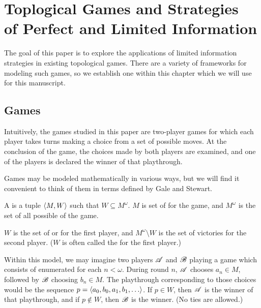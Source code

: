 
\chapter{Toplogical Games and Strategies\\ of Perfect and Limited Information}

The goal of this paper is to explore the applications of limited information
strategies in existing topological games. There are a variety of frameworks
for modeling such games, so we establish one within this chapter which we 
will use for this manuscript.

\section{Games}

Intuitively, the games studied in this paper are two-player games for which
each player takes turns making a choice from a set of possible moves. At
the conclusion of the game, the choices made by both players are examined,
and one of the players is declared the winner of that playthrough.

Games may be modeled mathematically in various ways,
but we will find it convenient to think of them in terms defined by
Gale and Stewart. \cite{gale}

\begin{defn}
  A  is a tuple $\langle M,W\rangle$ such that 
  $W\subseteq M^{\omega}$. $M$ is set of  for
  the game, and $M^{\omega}$ is the set of all possible 
   of the game.

  $W$ is the set of  or  for the 
  first player, and $M^{\omega}\setminus W$ is the set of victories for the 
  second player. ($W$ is often called the  for the
  first player.)
\end{defn}

Within this model, we may imagine two players $\mathscr{A}$ and $\mathscr{B}$ playing a 
game which consists of  enumerated for each $n<\omega$.
During round $n$, $\mathscr{A}$ chooses $a_n\in M$, followed by $\mathscr{B}$ choosing
$b_n\in M$. The playthrough corresponding to those choices would be
the sequence $p = \<a_0,b_0,a_1,b_1,\dots\>$. If $p\in W$, then $\mathscr{A}$
is the winner of that playthrough, and if $p\not\in W$, then $\mathscr{B}$ is
the winner. (No ties are allowed.)


